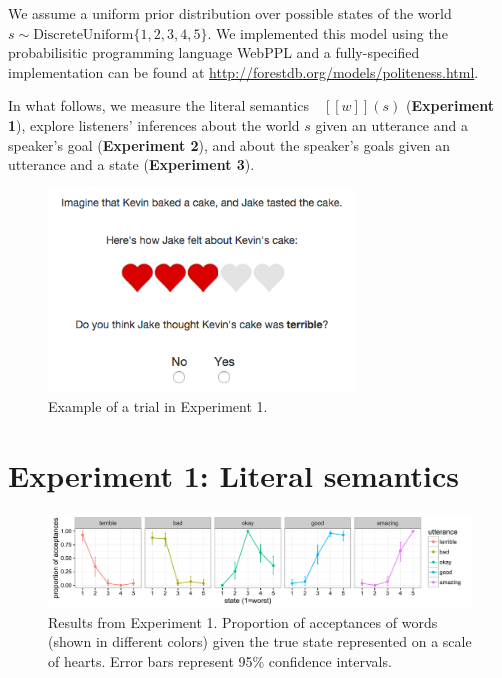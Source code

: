 \documentclass[10pt,letterpaper]{article}
\newcommand{\denote}[1]{\mbox{ $[\![ #1 ]\!]$}}
\begin{document}
We assume a uniform prior distribution over possible states of the world $s\sim \text{DiscreteUniform} \{1, 2, 3, 4, 5\}$. 
We implemented this model using the probabilisitic programming language WebPPL \cite{dippl} and a fully-specified implementation can be found at \url{http://forestdb.org/models/politeness.html}.

In what follows, we measure the literal semantics $\denote{w}(s)$ (\textbf{Experiment 1}), explore listeners' inferences about the world $s$ given an utterance and a speaker's goal (\textbf{Experiment 2}), and about the speaker's goals given an utterance and a state (\textbf{Experiment 3}).


%

\begin{figure}
\begin{centering} 
\includegraphics[width=3.2in]{figures/example.png}
\caption{\label{fig:ex} Example of a trial in Experiment 1.}
\end{centering} 
\end{figure}

\section{Experiment 1: Literal semantics}
\begin{figure}[t]
\begin{center} 
  \includegraphics[width=.9\textwidth]{figures/exp1.pdf}
  \caption{\label{fig:exp1} Results from Experiment 1. Proportion of acceptances of words (shown in different colors) given the true state represented on a scale of hearts. Error bars represent 95\% confidence intervals.}
  \end{center} 
\end{figure}
\end{document}
